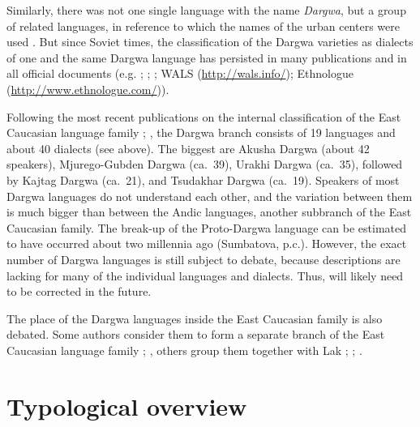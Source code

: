 Similarly, there was not one single language with the name \textit{Dargwa}, but a group of related languages, in reference to which the names of the urban centers were used \citep[1]{Uslar1892}. But since Soviet times, the classification of the Dargwa varieties as dialects of one and the same Dargwa language has persisted in many publications and in all official documents (e.g. ; ; ; WALS (\url{http://wals.info/}); Ethnologue (\url{http://www.ethnologue.com/})).

Following the most recent publications on the internal classification of the East Caucasian language family \citep{Korjakov2006}; \citep{Korjakov.Sumbatova2007}, the Dargwa branch consists of 19 languages and about 40 dialects (see  above). The biggest are Akusha Dargwa (about 42 speakers), Mjurego-Gubden Dargwa (ca.~39), Urakhi Dargwa (ca.~35), followed by Kajtag Dargwa (ca.~21), and Tsudakhar Dargwa (ca.~19). Speakers of most Dargwa languages do not understand each other, and the variation between them is much bigger than between the Andic languages, another subbranch of the East Caucasian family. The break-up of the Proto-Dargwa language can be estimated to have occurred about two millennia ago (Sumbatova, p.c.). However, the exact number of Dargwa languages is still subject to debate, because descriptions are lacking for many of the individual languages and dialects. Thus,  will likely need to be corrected in the future.

The place of the Dargwa languages inside the East Caucasian family is also debated. Some authors consider them to form a separate branch of the East Caucasian language family \citep[142]{Gigineishvili1977}; \citep{Kibrik1996}, others group them together with Lak \citep{Haspelmath1993}; \citep{Korjakov2006}; \citep{vandenBerg2005}.



\section{Typological overview}
\label{sec:Typological overview}


